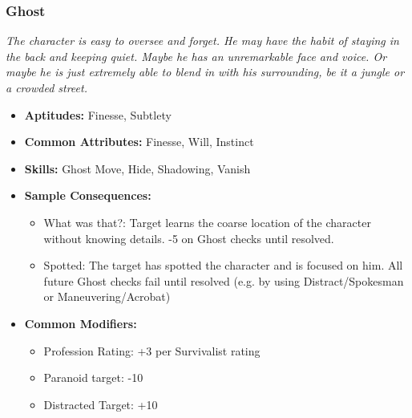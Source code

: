 \subsubsection{Ghost}\label{Ghost}
\textit{The character is easy to oversee and forget.
He may have the habit of staying in the back and keeping quiet.
Maybe he has an unremarkable face and voice.
Or maybe he is just extremely able to blend in with his surrounding, be it a jungle or a crowded street.}
\begin{itemize}
	\item \textbf{Aptitudes:} Finesse, Subtlety
	\item \textbf{Common Attributes:} Finesse, Will, Instinct
	\item \textbf{Skills:} Ghost Move, Hide, Shadowing, Vanish
	\item \textbf{Sample Consequences:} 
	\begin{itemize}
		\item What was that?: Target learns the coarse location of the character without knowing details. -5 on Ghost checks until resolved.
		\item Spotted: The target has spotted the character and is focused on him. All future Ghost checks fail until resolved (e.g. by using Distract/Spokesman or Maneuvering/Acrobat)
	\end{itemize}
	\item \textbf{Common Modifiers:}
	\begin{itemize}
		\item Profession Rating: +3 per Survivalist rating
		\item Paranoid target: -10
		\item Distracted Target: +10
	\end{itemize}
\end{itemize}

